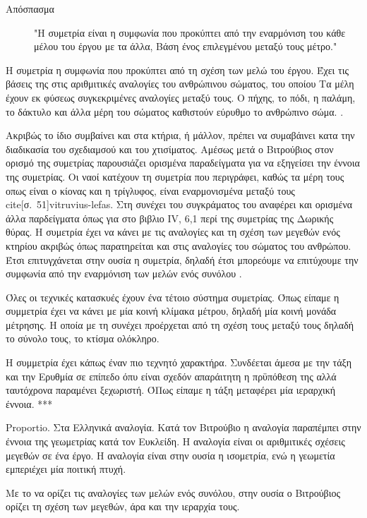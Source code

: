   \begin{description}
    \item[Απόσπασμα] "Η συμετρία είναι η συμφωνία που προκύπτει από την εναρμόνιση του κάθε μέλου του έργου με τα άλλα, Βάση ένος επιλεγμένου μεταξύ τους μέτρο."
  \end{description}

Η συμετρία η συμφωνία που προκύπτει από τη σχέση των μελώ του έργου. Έχει τις βάσεις της στις αριθμιτικές αναλογίες του ανθρώπινου σώματος, του οποίου Τα μέλη έχουν εκ φύσεως συγκεκριμένες αναλογίες μεταξύ τους. Ο πήχης, το πόδι, η παλάμη, το δάκτυλο και άλλα μέρη του σώματος καθιστούν εύρυθμο το ανθρώπινο σώμα. \cite[σ.~51]{vitruvius-lefas}.

Ακριβώς το ίδιο συμβαίνει και στα κτήρια, ή μάλλον, πρέπει να συμαβάινει κατα την διαδικασία του σχεδιαμσού και του χτισίματος. Αμέσως μετά ο Βιτρούβιος στον ορισμό της συμετρίας παρουσιάζει ορισμένα παραδείγματα για να εξηγείσει την έννοια της συμετρίας. Οι ναοί κατέχουν τη συμετρία που περιγράφει, καθώς τα μέρη τους οπως είναι ο κίονας και η τρίγλυφος, είναι εναρμονισμένα μεταξύ τους cite[σ.~51]{vitruvius-lefas}. Στη συνέχει του συγκράματος του αναφέρει και ορισμένα άλλα παρδείγματα όπως για στο βιβλιο IV, 6,1 περί της συμετρίας της Δωρικής θύρας. Η συμετρία έχει να κάνει με τις αναλογίες και τη σχέση των μεγεθών ενός κτηρίου ακριβώς όπως παρατηρείται και στις αναλογίες του σώματος του ανθρώπου. Έτσι επιτυγχάνεται στην ουσία η συμετρία, δηλαδή έτσι μπορεόυμε να επιτύχουμε την συμφωνία από την εναρμόνιση των μελών ενός συνόλου \cite[σ.~187]{lefas-fundamental}.

Όλες οι τεχνικές κατασκυές έχουν ένα τέτοιο σύστημα συμετρίας. Όπως είπαμε η συμμετρία έχει να κάνει με μία κοινή κλίμακα μέτρου, δηλαδή μία κοινή μονάδα μέτρησης. Η οποία με τη συνέχει προέρχεται από τη σχέση τους μεταξύ τους δηλαδή το σύνολο τους, το κτίσμα ολόκληρο.

Η συμμετρία έχει κάπως έναν πιο τεχνητό χαρακτήρα. Συνδέεται άμεσα με την τάξη και την Ερυθμία σε επίπεδο όπυ είναι σχεδόν απαράιτητη η πρϋπόθεση της αλλά ταυτόχρονα παραμένει ξεχωριστή. ΌΠως είπαμε η τάξη μεταφέρει μία ιεραρχική έννοια. ***

Proportio. Στα Ελληνικά αναλογία. Κατά τον Βιτρούβιο η αναλογία παραπέμπει στην έννοια της γεωμετρίας κατά τον Ευκλείδη. Η αναλογία είναι οι αριθμιτικές σχέσεις μεγεθών σε ένα έργο. Η αναλογία είναι στην ουσία η ισομετρία, ενώ η γεωμετία εμπεριέχει μία ποιτική πτυχή.

Με το να ορίζει τις αναλογίες των μελών ενός συνόλου, στην ουσία ο Βιτρούβιος ορίζει τη σχέση των μεγεθών, άρα και την ιεραρχία τους.
  
